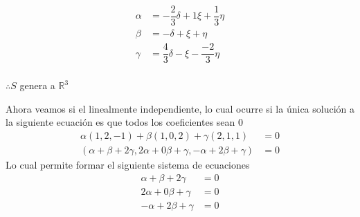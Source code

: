 \documentclass[letterpaper]{article}
\newcommand{\R}{\mathds{R}}
\renewcommand{\*}{\cdot}
\theoremstyle{definition}
\begin{document}
	\begin{align*}
		\alpha &= -\dfrac{2}{3}\delta + 1\xi + \dfrac{1}{3}\eta\\
		\beta &= -\delta + \xi + \eta\\
		\gamma &= \dfrac{4}{3}\delta - \xi - \dfrac{-2}{3}\eta\\
	\end{align*}
	\begin{center}
		$ \therefore S $ genera a $ \R^3 $
	\end{center}
	Ahora veamos si el linealmente independiente, lo cual ocurre si la única solución a la siguiente ecuación es que todos los coeficientes sean 0
	\begin{align*}
		\alpha(1,2,-1) + \beta(1,0,2) + \gamma(2,1,1) &= 0\\
		(\alpha + \beta + 2\gamma, 2\alpha + 0\beta + \gamma, -\alpha + 2 \beta + \gamma) &= 0
	\end{align*}
Lo cual permite formar el siguiente sistema de ecuaciones
	\begin{align*}
	\alpha + \beta + 2\gamma &=0\\
	2\alpha + 0\beta + \gamma &= 0\\
	-\alpha + 2\beta + \gamma &= 0
	\end{align*}
	
\end{document}
